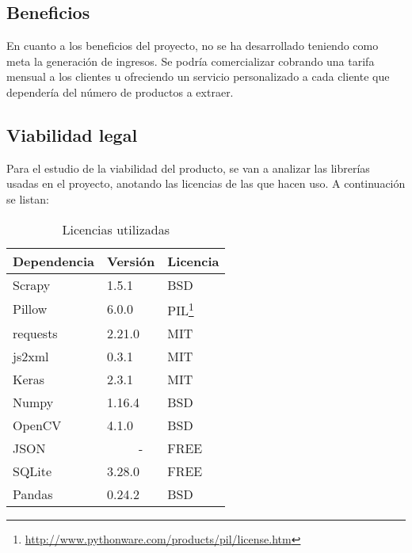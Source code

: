\subsection{Beneficios}
En cuanto a los beneficios del proyecto, no se ha desarrollado teniendo como meta la generación de ingresos. Se podría comercializar cobrando una tarifa mensual a los clientes u ofreciendo un servicio personalizado a cada cliente que dependería del número de productos a extraer.

\newpage
\subsection{Viabilidad legal}

Para el estudio de la viabilidad del producto, se van a analizar las librerías usadas en el proyecto, anotando las licencias de las que hacen uso. A continuación se listan:

\begin{savenotes}
\begin{table}[!h]
	\centering
	\begin{tabular}{l|l|l}
		\hline
		Dependencia & Versión & Licencia \\ \hline
		Scrapy & 1.5.1 & BSD \\
		Pillow & 6.0.0 & PIL\footnote{\url{http://www.pythonware.com/products/pil/license.htm}} \\
		requests & 2.21.0 & MIT \\
		js2xml & 0.3.1 & MIT \\
		Keras & 2.3.1 & MIT \\
		Numpy & 1.16.4 & BSD \\
		OpenCV & 4.1.0 & BSD \\
		JSON & \ \ \ \ \ - & FREE \\
		SQLite & 3.28.0 & FREE \\
		Pandas & 0.24.2 & BSD \\
		\bottomrule
	\end{tabular}
	\caption{Licencias utilizadas}
	\label{tab:licencias}
\end{table}
\end{savenotes}